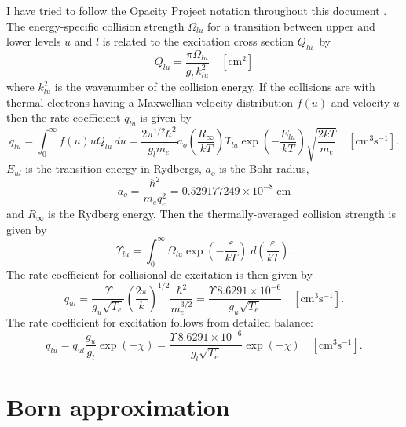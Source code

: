 I have tried to follow the Opacity Project notation throughout this
document \citep{Lanzafame1993}.
The energy-specific collision strength
$\Omega_{lu}$ for a transition between upper and lower levels $u$ and $l$ is related to
the excitation cross section $Q_{lu}$~by
\begin{equation}
{Q_{lu}} = \frac{{\pi {\Omega _{lu}}}}{{g_l \, k_{lu}^2}}
\quad [\mathrm{cm}^2]
\end{equation}
where $k_{lu}^2$  is the wavenumber of the collision energy.
If the collisions are with
thermal electrons having a Maxwellian velocity distribution $f(u)$ and velocity
$u$ then the rate coefficient $q_{lu}$ is given by
\begin{equation}
{q_{lu}} = \int_0^\infty  {f\left( u \right)} u{Q_{lu}}\,du = \frac{{2{\pi
^{1/2}}{\hbar ^2}}}{{{g_l}{m_e}}}{a_o}\left( {\frac{{{R_\infty }}}{{kT}}}
\right){\Upsilon _{lu}}\exp \left( { - \frac{{{E_{lu}}}}{{kT}}} \right)\sqrt
{\frac{{2kT}}{{{m_e}}}}\quad
[\mathrm{cm}^3 \mathrm{s}^{-1}].
\end{equation}
$E_{ul}$ is the transition energy in Rydbergs, $a_o$ is the Bohr radius,
\begin{equation}
{a_o} = \frac{{{\hbar ^2}}}{{{m_e}q_e^2}} = 0.529177249 \times {10^{ -
8}}\;{\mathrm{cm}}
\end{equation}
and ${R_\infty }$ is the Rydberg energy.
Then the thermally-averaged collision strength is given by
\begin{equation}
{\Upsilon _{lu}} = \int_0^\infty  {{\Omega _{lu}}\exp \left( { -
\frac{\varepsilon }{{kT}}} \right)\;d\left( {\frac{\varepsilon }{{kT}}}
\right)}.
\end{equation}
The rate coefficient for collisional de-excitation is then given by
\begin{equation}
{q_{ul}} = \frac{\Upsilon }{{{g_u}\sqrt {{T_e}} }}{\left( {\frac{{2\pi
}}{k}} \right)^{1/2}}\frac{{{\hbar ^2}}}{{m_e^{3/2}}} = \frac{{\Upsilon
\,8.6291 \times {{10}^{ - 6}}}}{{{g_u}\sqrt {{T_e}} }}
\quad  [\mathrm{cm}^3 \mathrm{s}^{-1}].
\end{equation}
The rate coefficient for excitation follows from detailed balance:
\begin{equation}
{q_{lu}} = {q_{ul}}\frac{{{g_u}}}{{{g_l}}}\exp \left( { - \chi } \right)
= \frac{{\Upsilon \,8.6291 \times {{10}^{ - 6}}}}{{{g_l}\sqrt {{T_e}} }}\exp
\left( { - \chi } \right)\quad  [\mathrm{cm}^3 \mathrm{s}^{-1}].
\end{equation}

\section{Born approximation }

